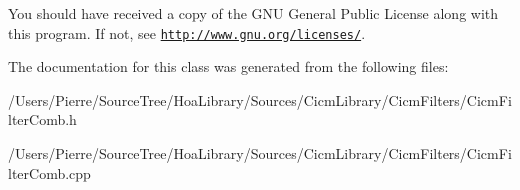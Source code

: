You should have received a copy of the G\-N\-U General Public License along with this program. If not, see \href{http://www.gnu.org/licenses/}{\tt http\-://www.\-gnu.\-org/licenses/}. 

The documentation for this class was generated from the following files\-:\begin{DoxyCompactItemize}
\item 
/\-Users/\-Pierre/\-Source\-Tree/\-Hoa\-Library/\-Sources/\-Cicm\-Library/\-Cicm\-Filters/Cicm\-Filter\-Comb.\-h\item 
/\-Users/\-Pierre/\-Source\-Tree/\-Hoa\-Library/\-Sources/\-Cicm\-Library/\-Cicm\-Filters/Cicm\-Filter\-Comb.\-cpp\end{DoxyCompactItemize}
